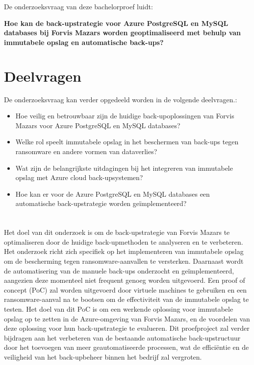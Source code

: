 \section{}%
\label{sec:onderzoeksvraag}

De onderzoeksvraag van deze bachelorproef luidt:

\textbf{Hoe kan de back-upstrategie voor Azure PostgreSQL en MySQL databases bij Forvis Mazars worden geoptimaliseerd met behulp van immutabele opslag en automatische back-ups?}

\section{Deelvragen}
De onderzoeksvraag kan verder opgedeeld worden in de volgende deelvragen.:
\begin{itemize}
    \item Hoe veilig en betrouwbaar zijn de huidige back-upoplossingen van Forvis Mazars voor Azure PostgreSQL en MySQL databases?
    \item Welke rol speelt immutabele opslag in het beschermen van back-ups tegen ransomware en andere vormen van dataverlies?
    \item Wat zijn de belangrijkste uitdagingen bij het integreren van immutabele opslag met Azure cloud back-upsystemen?
    \item Hoe kan er voor de Azure PostgreSQL en MySQL databases een automatische back-upstrategie worden geïmplementeerd?
\end{itemize}

\section{}%
\label{sec:onderzoeksdoelstelling}

Het doel van dit onderzoek is om de back-upstrategie van Forvis Mazars te optimaliseren door de huidige back-upmethoden te analyseren en te verbeteren. Het onderzoek richt zich specifiek op het implementeren van immutabele opslag om de bescherming tegen ransomware-aanvallen te versterken. Daarnaast wordt de automatisering van de manuele back-ups onderzocht en geïmplementeerd, aangezien deze momenteel niet frequent genoeg worden uitgevoerd. Een proof of concept (PoC) zal worden uitgevoerd door virtuele machines te gebruiken en een ransomware-aanval na te bootsen om de effectiviteit van de immutabele opslag te testen. Het doel van dit PoC is om een werkende oplossing voor immutabele opslag op te zetten in de Azure-omgeving van Forvis Mazars, en de voordelen van deze oplossing voor hun back-upstrategie te evalueren. Dit proefproject zal verder bijdragen aan het verbeteren van de bestaande automatische back-upstructuur door het toevoegen van meer geautomatiseerde processen, wat de efficiëntie en de veiligheid van het back-upbeheer binnen het bedrijf zal vergroten.

